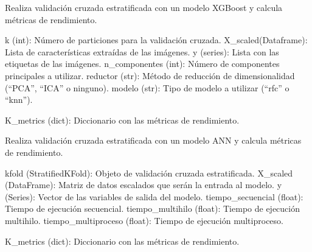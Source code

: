 \documentclass[letterpaper,10pt,spanish]{sphinxmanual}
\begin{document}
\begin{fulllineitems}
\label{\detokenize{Reduccion_Dimension:Modelos.calculo_tiempos}}
\pysigstartsignatures
\pysiglinewithargsret
{}
{\sphinxparamcomma {}\sphinxparamcomma {}\sphinxparamcomma {}\sphinxparamcomma {}\sphinxparamcomma {}}
{}
\pysigstopsignatures
\sphinxAtStartPar
Realiza validación cruzada estratificada con un modelo XGBoost y calcula métricas de rendimiento.
\begin{description}
\sphinxAtStartPar
k (int): Número de particiones para la validación cruzada.
X\_scaled(Dataframe): Lista de características extraídas de las imágenes.
y (series): Lista con las etiquetas de las imágenes.
n\_componentes (int): Número de componentes principales a utilizar.
reductor (str): Método de reducción de dimensionalidad (“PCA”, “ICA” o ninguno).
modelo (str): Tipo de modelo a utilizar (“rfc” o “knn”).

\sphinxAtStartPar
K\_metrics (dict): Diccionario con las métricas de rendimiento.

\end{description}

\end{fulllineitems}


\begin{fulllineitems}
\label{\detokenize{Reduccion_Dimension:Modelos.metricas_ann}}
\pysigstartsignatures
\pysiglinewithargsret
{}
{\sphinxparamcomma {}\sphinxparamcomma {}\sphinxparamcomma {}\sphinxparamcomma {}\sphinxparamcomma {}}
{}
\pysigstopsignatures
\sphinxAtStartPar
Realiza validación cruzada estratificada con un modelo ANN y calcula métricas de rendimiento.
\begin{description}
\sphinxAtStartPar
kfold (StratifiedKFold): Objeto de validación cruzada estratificada.
X\_scaled (DataFrame): Matriz de datos escalados que serán la entrada al modelo.
y (Series): Vector de las variables de salida del modelo.
tiempo\_secuencial (float): Tiempo de ejecución secuencial.
tiempo\_multihilo (float): Tiempo de ejecución multihilo.
tiempo\_multiproceso (float): Tiempo de ejecución multiproceso.

\sphinxAtStartPar
K\_metrics (dict): Diccionario con las métricas de rendimiento.

\end{description}

\end{fulllineitems}
\end{document}
